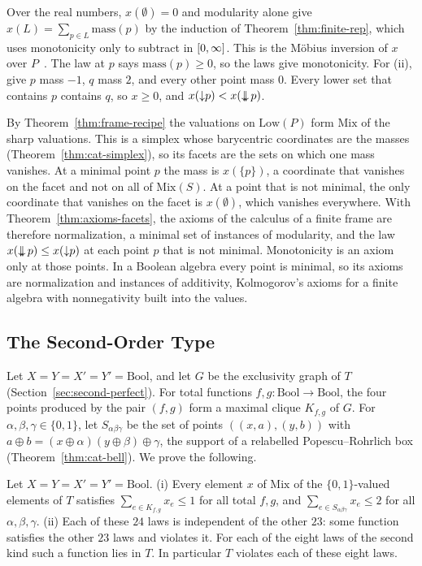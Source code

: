 \noindent
Over the real numbers, $x(\emptyset) = 0$ and modularity alone give
$x(L) = \sum_{p \in L} \mathrm{mass}(p)$ by the induction of
Theorem~\ref{thm:finite-rep}, which uses monotonicity only to subtract
in $[0,\infty]$. This is the Möbius inversion of $x$ over
$P$~\cite{rota1964}. The law at $p$ says $\mathrm{mass}(p) \ge 0$, so
the laws give monotonicity. For (ii), give $p$ mass $-1$, $q$ mass $2$,
and every other point mass $0$. Every lower set that contains $p$
contains $q$, so $x \ge 0$, and $x({\downarrow} p) < x(\mathop{\downarrow\!\!\downarrow} p)$.

By Theorem~\ref{thm:frame-recipe} the valuations on $\mathrm{Low}(P)$
form $\mathrm{Mix}$ of the sharp valuations. This is a simplex whose
barycentric coordinates are the masses (Theorem~\ref{thm:cat-simplex}),
so its facets are the sets on which one mass vanishes. At a minimal point
$p$ the mass is $x(\{p\})$, a coordinate that vanishes on the facet and
not on all of $\mathrm{Mix}(S)$. At a point that is not minimal, the only
coordinate that vanishes on the facet is $x(\emptyset)$, which vanishes
everywhere. With Theorem~\ref{thm:axioms-facets}, the axioms of the calculus
of a finite frame are therefore normalization, a minimal set of instances
of modularity, and the law $x(\mathop{\downarrow\!\!\downarrow} p) \le x({\downarrow} p)$ at each point
$p$ that is not minimal. Monotonicity is an axiom only at those points.
In a Boolean algebra every point is minimal, so its axioms are
normalization and instances of additivity, Kolmogorov's axioms for a
finite algebra with nonnegativity built into the values.

\subsection{The Second-Order Type}
\label{sec:axioms-second}

Let $X = Y = X' = Y' = \mathrm{Bool}$, and let $G$ be the exclusivity
graph of $T$ (Section~\ref{sec:second-perfect}). For total functions
$f, g : \mathrm{Bool} \to \mathrm{Bool}$, the four points produced by the
pair $(f, g)$ form a maximal clique $K_{f,g}$ of $G$. For
$\alpha, \beta, \gamma \in \{0,1\}$, let $S_{\alpha\beta\gamma}$ be the
set of points $((x,a),(y,b))$ with
$a \oplus b = (x \oplus \alpha)(y \oplus \beta) \oplus \gamma$, the
support of a relabelled Popescu--Rohrlich box
(Theorem~\ref{thm:cat-bell}). We prove the following.

\begin{theorem}
\label{thm:axioms-second}
Let $X = Y = X' = Y' = \mathrm{Bool}$.
(i) Every element $x$ of $\mathrm{Mix}$ of the $\{0,1\}$-valued elements
of $T$ satisfies $\sum_{e \in K_{f,g}} x_e \le 1$ for all total $f, g$,
and $\sum_{e \in S_{\alpha\beta\gamma}} x_e \le 2$ for all $\alpha,
\beta, \gamma$.
(ii) Each of these $24$ laws is independent of the other $23$: some
function satisfies the other $23$ laws and violates it. For each of the
eight laws of the second kind such a function lies in $T$. In particular
$T$ violates each of these eight laws.
\end{theorem}

